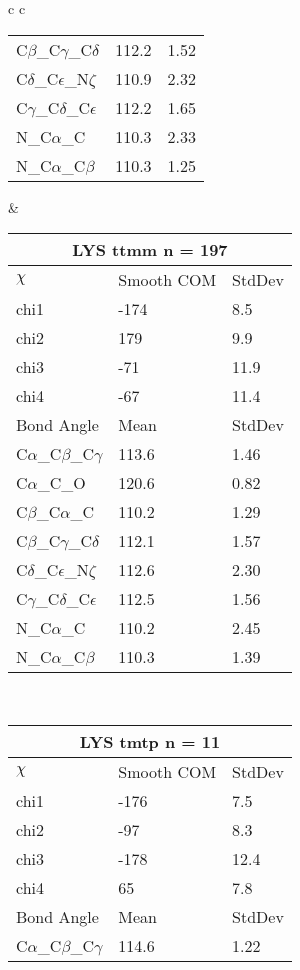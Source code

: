 \begin{longtable}{ c c }
\begin{tabular}{ l l l }
  C$\beta$\_C$\gamma$\_C$\delta$ & 112.2 & 1.52\\
  C$\delta$\_C$\epsilon$\_N$\zeta$ & 110.9 & 2.32\\
  C$\gamma$\_C$\delta$\_C$\epsilon$ & 112.2 & 1.65\\
  N\_C$\alpha$\_C & 110.3 & 2.33\\
  N\_C$\alpha$\_C$\beta$ & 110.3 & 1.25\\
  \bottomrule
  \end{tabular}
  &
  \begin{tabular}{ l l l }
  \toprule
  \multicolumn{3}{c}{LYS \textbf{ttmm} n = 197} \\ \toprule
  $\chi$       & Smooth COM & StdDev \\ \midrule
  chi1 & -174 & 8.5 \\ 
  chi2 & 179 & 9.9 \\ 
  chi3 & -71 & 11.9 \\ 
  chi4 & -67 & 11.4 \\ \midrule
  Bond Angle   & Mean     & StdDev \\ \midrule
  C$\alpha$\_C$\beta$\_C$\gamma$ & 113.6 & 1.46\\
  C$\alpha$\_C\_O & 120.6 & 0.82\\
  C$\beta$\_C$\alpha$\_C & 110.2 & 1.29\\
  C$\beta$\_C$\gamma$\_C$\delta$ & 112.1 & 1.57\\
  C$\delta$\_C$\epsilon$\_N$\zeta$ & 112.6 & 2.30\\
  C$\gamma$\_C$\delta$\_C$\epsilon$ & 112.5 & 1.56\\
  N\_C$\alpha$\_C & 110.2 & 2.45\\
  N\_C$\alpha$\_C$\beta$ & 110.3 & 1.39\\
  \bottomrule
  \end{tabular}
  \\
  \begin{tabular}{ l l l }
  \toprule
  \multicolumn{3}{c}{LYS \textbf{tmtp} n = 11} \\ \toprule
  $\chi$       & Smooth COM & StdDev \\ \midrule
  chi1 & -176 & 7.5 \\ 
  chi2 & -97 & 8.3 \\ 
  chi3 & -178 & 12.4 \\ 
  chi4 & 65 & 7.8 \\ \midrule
  Bond Angle   & Mean     & StdDev \\ \midrule
  C$\alpha$\_C$\beta$\_C$\gamma$ & 114.6 & 1.22\\

\end{tabular}
\end{longtable}
